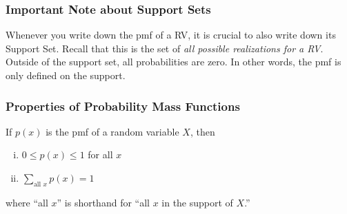 \begin{frame}
\frametitle{Important Note about Support Sets}
Whenever you write down the pmf of a RV, it is \alert{crucial} to also write down its Support Set. Recall that this is the set of \alert{\emph{all possible realizations for a RV}}. Outside of the support set, all probabilities are zero. In other words, the pmf is \alert{only defined} on the support.

\end{frame}
\begin{frame}
\frametitle{Properties of Probability Mass Functions}

If $p(x)$ is the pmf of a random variable $X$, then
\begin{enumerate}[(i)]
	\item $0\leq p(x) \leq 1$ for all $x$ \vspace{1em}
	\item $\displaystyle \sum_{\mbox{all } x} p(x) = 1$
\end{enumerate}

\vspace{0.75em}
where ``all $x$'' is shorthand for ``all $x$ in the support of $X$.''
\end{frame}


